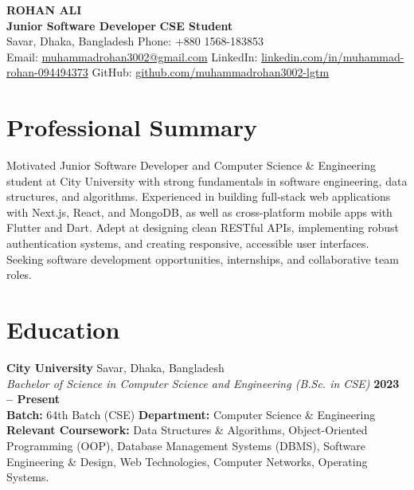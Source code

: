 \documentclass[10pt,a4paper]{article}
\begin{document}
\begin{center}
    {\Huge\bfseries\color{navy} ROHAN ALI} \\[2pt]
    {\large\color{teal}\textbf{Junior Software Developer} \textbar{} \textbf{CSE Student}} \\[3pt]
    \small\color{darkgray}
    Savar, Dhaka, Bangladesh \quad\textbullet\quad Phone: +880 1568-183853 \\[2pt]
    Email: \href{mailto:muhammadrohan3002@gmail.com}{muhammadrohan3002@gmail.com} \quad\textbullet\quad
    LinkedIn: \href{https://www.linkedin.com/in/muhammad-rohan-094494373/}{linkedin.com/in/muhammad-rohan-094494373} \quad\textbullet\quad
    GitHub: \href{https://github.com/muhammadrohan3002-lgtm}{github.com/muhammadrohan3002-lgtm}
\end{center}
\vspace{-6pt}

\section{Professional Summary}
Motivated Junior Software Developer and Computer Science \& Engineering student at City University with strong fundamentals in software engineering, data structures, and algorithms. Experienced in building full-stack web applications with Next.js, React, and MongoDB, as well as cross-platform mobile apps with Flutter and Dart. Adept at designing clean RESTful APIs, implementing robust authentication systems, and creating responsive, accessible user interfaces. Seeking software development opportunities, internships, and collaborative team roles.

\section{Education}
\textbf{City University} \hfill Savar, Dhaka, Bangladesh \\
\textit{Bachelor of Science in Computer Science and Engineering (B.Sc. in CSE)} \hfill \textbf{2023 -- Present} \\
\textbullet{} \textbf{Batch:} 64th Batch (CSE) \quad\textbullet{} \textbf{Department:} Computer Science \& Engineering \\
\textbullet{} \textbf{Relevant Coursework:} Data Structures \& Algorithms, Object-Oriented Programming (OOP), Database Management Systems (DBMS), Software Engineering \& Design, Web Technologies, Computer Networks, Operating Systems.
\end{document}
